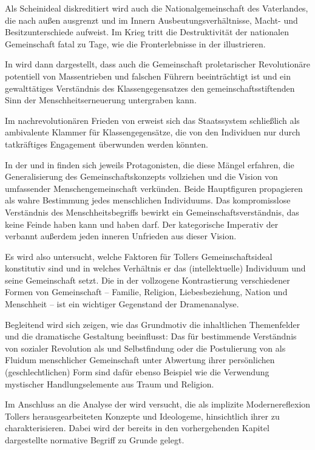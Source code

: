 Als Scheinideal diskreditiert wird auch die
Nationalgemeinschaft des Vaterlandes, die nach außen \Cite{Fremde} ausgrenzt
und im Innern Ausbeutungsverhältnisse, Macht- und Besitzunterschiede
aufweist. Im Krieg tritt die Destruktivität der nationalen Gemeinschaft fatal
zu Tage, wie die Fronterlebnisse in der  illustrieren.  

In  wird dann dargestellt, dass auch die Gemeinschaft
proletarischer Revolutionäre potentiell von Massentrieben und falschen Führern
beeinträchtigt ist und ein gewalttätiges Verständnis des Klassengegensatzes
den gemeinschaftsstiftenden Sinn der Menschheitserneuerung untergraben kann.

Im nachrevolutionären Frieden von  erweist sich das
Staatssystem schließlich als ambivalente Klammer für Klassengegensätze, die von den
Individuen nur durch tatkräftiges Engagement überwunden werden könnten. 

In der  und in  finden sich jeweils Protagonisten, die
diese Mängel erfahren, die Generalisierung des Gemeinschaftskonzepts
vollziehen und die Vision von umfassender Menschengemeinschaft verkünden.
Beide Hauptfiguren propagieren \Cite{die Liebe zu den Menschen}
als wahre Bestimmung jedes menschlichen Individuums. Das kompromisslose
Verständnis des Menschheitsbegriffs bewirkt ein Gemeinschaftsverständnis, das
keine Feinde haben kann und haben darf. Der kategorische Imperativ der \Cite{Liebe}
verbannt außerdem jeden inneren Unfrieden aus dieser Vision.

Es wird also untersucht, welche Faktoren für Tollers Gemeinschaftsideal konstitutiv
sind und in welches Verhältnis er das (intellektuelle) Individuum und seine
Gemeinschaft setzt. Die in der  vollzogene Kontrastierung verschiedener
Formen von Gemeinschaft -- Familie, Religion, Liebesbeziehung, Nation und 
Menschheit -- ist ein wichtiger Gegenstand der Dramenanalyse.

Begleitend wird sich zeigen, wie das Grundmotiv die inhaltlichen
Themenfelder und die dramatische Gestaltung beeinflusst: Das für  bestimmende Verständnis von sozialer Revolution als
\Cite{Erweckung} und Selbstfindung oder die Postulierung von \Cite{Liebe} als
Fluidum menschlicher Gemeinschaft unter Abwertung ihrer persönlichen
(geschlechtlichen) Form sind dafür ebenso Beispiel wie die
Verwendung mystischer Handlungselemente aus Traum und Religion.

Im Anschluss an die Analyse der  wird versucht, die als
implizite Modernereflexion Tollers herausgearbeiteten Konzepte und
Ideologeme, hinsichtlich ihrer \Cite{Modernität} zu charakterisieren. Dabei
wird der bereits in den vorhergehenden Kapitel dargestellte normative
Begriff \Cite{modernen Bewusstseins} zu Grunde gelegt. 

